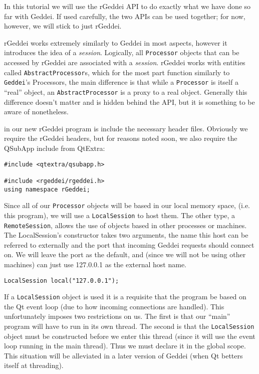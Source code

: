 In this tutorial we will use the rGeddei API to do exactly what we have done so far with Geddei. If used carefully, the two APIs can be used together; for now, however, we will stick to just rGeddei.

rGeddei works extremely similarly to Geddei in most aspects, however it introduces the idea of a \textit{session}. Logically, all \texttt{Processor} objects that can be accessed by rGeddei are associated with a \textit{session}. rGeddei works with entities called \texttt{AbstractProcessor}s, which for the most part function similarly to \texttt{Geddei}'s Processors, the main difference is that while a \texttt{Processor} is itself a ``real'' object, an \texttt{AbstractProcessor} is a proxy to a real object. Generally this difference doesn't matter and is hidden behind the API, but it is something to be aware of nonetheless.


 in our new rGeddei program is include the necessary header files. Obviously we require the rGeddei headers, but for reasons noted soon, we also require the QSubApp include from QtExtra:

\begin{verbatim}
#include <qtextra/qsubapp.h>

#include <rgeddei/rgeddei.h>
using namespace rGeddei;
\end{verbatim}

Since all of our \texttt{Processor} objects will be based in our local memory space, (i.e. this program), we will use a \texttt{LocalSession} to host them. The other type, a \texttt{RemoteSession}, allows the use of objects based in other processes or machines. The LocalSession's constructor takes two arguments, the name this host can be referred to externally and the port that incoming Geddei requests should connect on. We will leave the port as the default, and (since we will not be using other machines) can just use 127.0.0.1 as the external host name.

\begin{verbatim}
LocalSession local("127.0.0.1");
\end{verbatim}

If a \texttt{LocalSession} object is used it is a requisite that the program be based on the Qt event loop (due to how incoming connections are handled). This unfortunately imposes two restrictions on us. The first is that our ``main'' program will have to run in its own thread. The second is that the \texttt{LocalSession} object must be constructed before we enter this thread (since it will use the event loop running in the main thread). Thus we must declare it in the global scope. This situation will be alleviated in a later version of Geddei (when Qt betters itself at threading).

